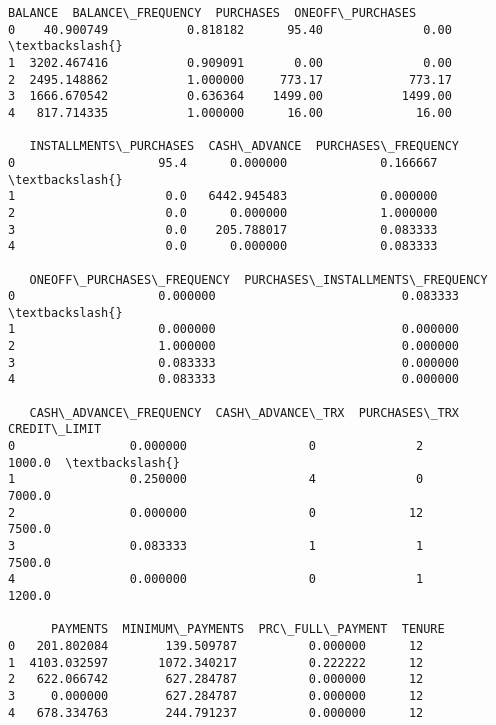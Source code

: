 \documentclass[11pt]{article}
\makeatletter
\newcommand{\boxspacing}{\kern\kvtcb@left@rule\kern\kvtcb@boxsep}
\newcommand{\prompt}[4]{
        {\ttfamily\llap{{\color{#2}[#3]:\hspace{3pt}#4}}\vspace{-\baselineskip}}
    }
\makeatother
\begin{document}
            \begin{tcolorbox}[breakable, size=fbox, boxrule=.5pt, pad at break*=1mm, opacityfill=0]
\prompt{Out}{outcolor}{75}{\boxspacing}
\begin{Verbatim}[commandchars=\\\{\}]
       BALANCE  BALANCE\_FREQUENCY  PURCHASES  ONEOFF\_PURCHASES
0    40.900749           0.818182      95.40              0.00  \textbackslash{}
1  3202.467416           0.909091       0.00              0.00
2  2495.148862           1.000000     773.17            773.17
3  1666.670542           0.636364    1499.00           1499.00
4   817.714335           1.000000      16.00             16.00

   INSTALLMENTS\_PURCHASES  CASH\_ADVANCE  PURCHASES\_FREQUENCY
0                    95.4      0.000000             0.166667  \textbackslash{}
1                     0.0   6442.945483             0.000000
2                     0.0      0.000000             1.000000
3                     0.0    205.788017             0.083333
4                     0.0      0.000000             0.083333

   ONEOFF\_PURCHASES\_FREQUENCY  PURCHASES\_INSTALLMENTS\_FREQUENCY
0                    0.000000                          0.083333  \textbackslash{}
1                    0.000000                          0.000000
2                    1.000000                          0.000000
3                    0.083333                          0.000000
4                    0.083333                          0.000000

   CASH\_ADVANCE\_FREQUENCY  CASH\_ADVANCE\_TRX  PURCHASES\_TRX  CREDIT\_LIMIT
0                0.000000                 0              2        1000.0  \textbackslash{}
1                0.250000                 4              0        7000.0
2                0.000000                 0             12        7500.0
3                0.083333                 1              1        7500.0
4                0.000000                 0              1        1200.0

      PAYMENTS  MINIMUM\_PAYMENTS  PRC\_FULL\_PAYMENT  TENURE
0   201.802084        139.509787          0.000000      12
1  4103.032597       1072.340217          0.222222      12
2   622.066742        627.284787          0.000000      12
3     0.000000        627.284787          0.000000      12
4   678.334763        244.791237          0.000000      12
\end{Verbatim}
\end{tcolorbox}
        
\end{document}
